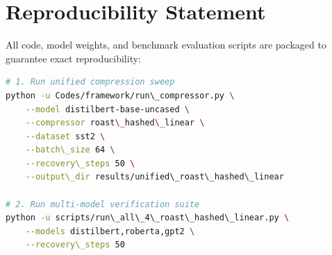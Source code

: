 \section{Reproducibility Statement}
All code, model weights, and benchmark evaluation scripts are packaged to guarantee exact reproducibility:
\begin{lstlisting}[language=bash]
# 1. Run unified compression sweep
python -u Codes/framework/run\_compressor.py \
    --model distilbert-base-uncased \
    --compressor roast\_hashed\_linear \
    --dataset sst2 \
    --batch\_size 64 \
    --recovery\_steps 50 \
    --output\_dir results/unified\_roast\_hashed\_linear

# 2. Run multi-model verification suite
python -u scripts/run\_all\_4\_roast\_hashed\_linear.py \
    --models distilbert,roberta,gpt2 \
    --recovery\_steps 50
\end{lstlisting}
